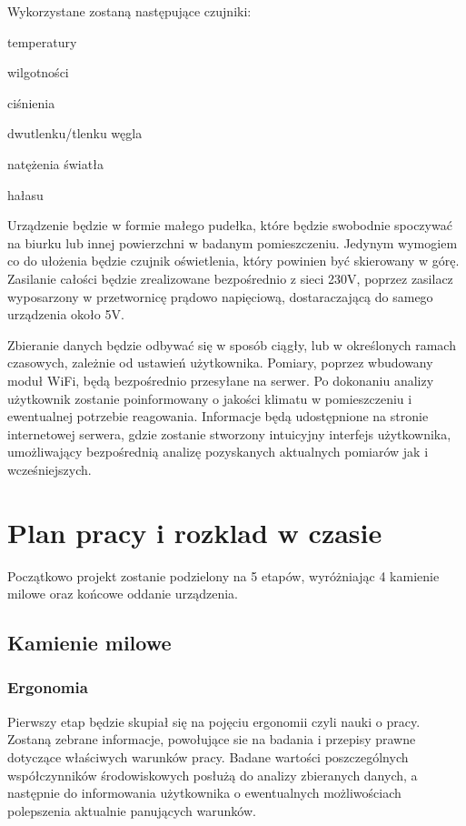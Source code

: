 \documentclass[10pt, a4paper]{article}
\begin{document}
Wykorzystane zostaną następujące czujniki:

\begin{description}[font=$\bullet$~\normalfont]
\item temperatury
\item wilgotności
\item ciśnienia
\item dwutlenku/tlenku węgla
\item natężenia światła
\item hałasu
\end{description}

Urządzenie będzie w formie małego pudełka, które będzie swobodnie spoczywać na biurku lub innej powierzchni w badanym pomieszczeniu. Jedynym wymogiem co do ułożenia będzie czujnik oświetlenia, który powinien być skierowany w górę. Zasilanie całości będzie zrealizowane bezpośrednio z sieci 230V, poprzez zasilacz wyposarzony w przetwornicę prądowo napięciową, dostaraczającą do samego urządzenia około 5V.

Zbieranie danych będzie odbywać się w sposób ciągły, lub w określonych ramach czasowych, zależnie od ustawień użytkownika. Pomiary, poprzez wbudowany moduł WiFi, będą bezpośrednio przesyłane na serwer. Po dokonaniu analizy użytkownik zostanie poinformowany o jakości klimatu w pomieszczeniu i ewentualnej potrzebie reagowania. Informacje będą udostępnione na stronie internetowej serwera, gdzie zostanie stworzony intuicyjny interfejs użytkownika, umożliwający bezpośrednią analizę pozyskanych aktualnych pomiarów jak i wcześniejszych.

\section{Plan pracy i rozklad w czasie}

Początkowo projekt zostanie podzielony na 5 etapów, wyróżniając 4 kamienie milowe oraz końcowe oddanie urządzenia. 
\subsection{Kamienie milowe}
\subsubsection{Ergonomia}
Pierwszy etap będzie skupiał się na pojęciu ergonomii czyli nauki o pracy. Zostaną zebrane informacje, powołujące sie na badania i przepisy prawne dotyczące właściwych warunków pracy. Badane wartości poszczególnych współczynników środowiskowych posłużą do analizy zbieranych danych, a następnie do informowania użytkownika o ewentualnych możliwościach polepszenia aktualnie panujących warunków.
\end{document}
